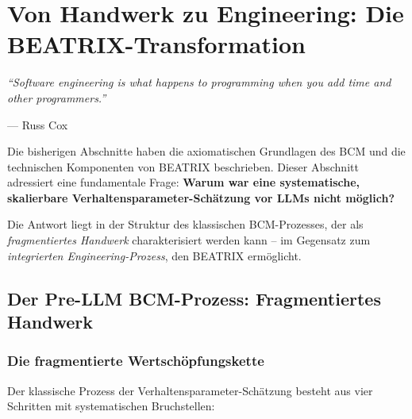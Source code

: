 \section{Von Handwerk zu Engineering: Die BEATRIX-Transformation}

\epigraph{\textit{``Software engineering is what happens to programming when you add time and other programmers.''}}{--- Russ Cox}

Die bisherigen Abschnitte haben die axiomatischen Grundlagen des BCM und die technischen Komponenten von BEATRIX beschrieben. Dieser Abschnitt adressiert eine fundamentale Frage: \textbf{Warum war eine systematische, skalierbare Verhaltensparameter-Schätzung vor LLMs nicht möglich?}

Die Antwort liegt in der Struktur des klassischen BCM-Prozesses, der als \textit{fragmentiertes Handwerk} charakterisiert werden kann -- im Gegensatz zum \textit{integrierten Engineering-Prozess}, den BEATRIX ermöglicht.

\subsection{Der Pre-LLM BCM-Prozess: Fragmentiertes Handwerk}

\subsubsection{Die fragmentierte Wertschöpfungskette}

Der klassische Prozess der Verhaltensparameter-Schätzung besteht aus vier Schritten mit systematischen Bruchstellen:

